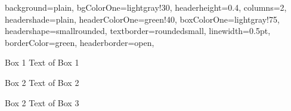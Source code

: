 \documentclass[portrait,fontscale=0.7,margin=0.7cm,paperwidth=15truecm, paperheight=9truecm,debug]{baposter}
\begin{document}
\begin{poster}{
  background=plain,
  bgColorOne=lightgray!30,
  headerheight=0.4\textheight,
  columns=2,
  headershade=plain,
  headerColorOne=green!40,
  boxColorOne=lightgray!75,
  headershape=smallrounded,
  textborder=roundedsmall,
  linewidth=0.5pt,
  borderColor=green,
  headerborder=open,
}{}{}{}{}

\begin{posterbox}[column=0]{Box 1}
Text of Box 1
\end{posterbox}

\begin{posterbox}[column=0,below=auto,height=bottom]{Box 2}
Text of Box 2
\end{posterbox}

\begin{posterbox}[column=1,height=bottom]{Box 2}
Text of Box 3
\end{posterbox}

\end{poster}
\end{document}
